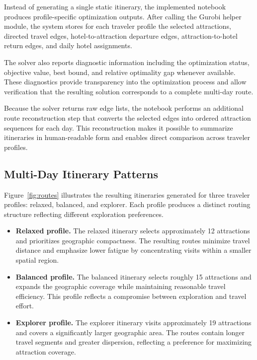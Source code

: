 \documentclass[12pt,a4paper]{article}
\begin{document}
Instead of generating a single static itinerary, the implemented notebook produces profile-specific optimization outputs. After calling the Gurobi helper module, the system stores for each traveler profile the selected attractions, directed travel edges, hotel-to-attraction departure edges, attraction-to-hotel return edges, and daily hotel assignments.

The solver also reports diagnostic information including the optimization status, objective value, best bound, and relative optimality gap whenever available. These diagnostics provide transparency into the optimization process and allow verification that the resulting solution corresponds to a complete multi-day route.

Because the solver returns raw edge lists, the notebook performs an additional route reconstruction step that converts the selected edges into ordered attraction sequences for each day. This reconstruction makes it possible to summarize itineraries in human-readable form and enables direct comparison across traveler profiles.

\subsection{Multi-Day Itinerary Patterns}

Figure~\ref{fig:routes} illustrates the resulting itineraries generated for three traveler profiles: relaxed, balanced, and explorer. Each profile produces a distinct routing structure reflecting different exploration preferences.

\begin{itemize}
    \item \textbf{Relaxed profile.} The relaxed itinerary selects approximately 12 attractions and prioritizes geographic compactness. The resulting routes minimize travel distance and emphasize lower fatigue by concentrating visits within a smaller spatial region.

    \item \textbf{Balanced profile.} The balanced itinerary selects roughly 15 attractions and expands the geographic coverage while maintaining reasonable travel efficiency. This profile reflects a compromise between exploration and travel effort.

    \item \textbf{Explorer profile.} The explorer itinerary visits approximately 19 attractions and covers a significantly larger geographic area. The routes contain longer travel segments and greater dispersion, reflecting a preference for maximizing attraction coverage.
\end{itemize}
\end{document}
